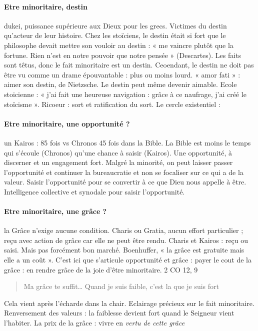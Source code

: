 \paragraph{Etre minoritaire, destin} dukei, puissance supérieure aux Dieux pour les grecs. Victimes du destin qu’acteur de leur histoire. Chez les stoïciens, le destin était si fort que le philosophe devait mettre son vouloir au destin : « me vaincre plutôt que la fortune. Rien n’est en notre pouvoir que notre pensée » (Descartes). 
Les faits sont têtus, donc le fait minoritaire est un destin. Ceoendant, le destin ne doit pas être vu comme un drame épouvantable : plus ou moins lourd. « amor fati » : aimer son destin, de Nietzsche. Le destin peut même devenir aimable. Ecole stoicienne : « j’ai fait une heureuse navigation : grâce à ce naufrage, j’ai créé le stoïcisme ». Ricoeur : sort et ratification du sort. Le cercle existentiel : 
\paragraph{Etre minoritaire, une opportunité ?} un Kairos : 85 fois vs Chronos 45 fois dans la Bible. La Bible est moins le temps qui s’écoule (Chronos) qu’une chance à saisir (Kairos).  Une opportunité, à discerner et un engagement fort. 
Malgré la minorité, on peut laisser passer l’opportunité et continuer la bureaucratie et non se focaliser sur ce qui a de la valeur. Saisir l’opportunité pour se convertir à ce que Dieu nous appelle à être. Intelligence collective et synodale pour saisir l’opportunité. 
\paragraph{Etre minoritaire, une grâce ?} la Grâce n’exige aucune condition. Charis ou Gratia, aucun effort particulier ; reçu avec action de grâce car elle ne peut être rendu. Charis et Kairos : reçu ou saisi.
Mais pas forcément bon marché. Boenhuffer, « la grâce est gratuite mais elle a un coût ». C’est ici que s’articule opportunité et grâce : payer le cout de la grâce : en rendre grâce de la joie d’être minoritaire.
2 CO 12, 9
\begin{quote}
Ma grâce te suffit…
Quand je suis faible, c’est la que je suis fort
\end{quote} 
Cela vient après l’écharde dans la chair. Eclairage précieux sur le fait minoritaire. Renversement des valeurs : la faiblesse devient fort quand le Seigneur vient l’habiter. La prix de la grâce : vivre en \textit{ vertu de cette grâce }

